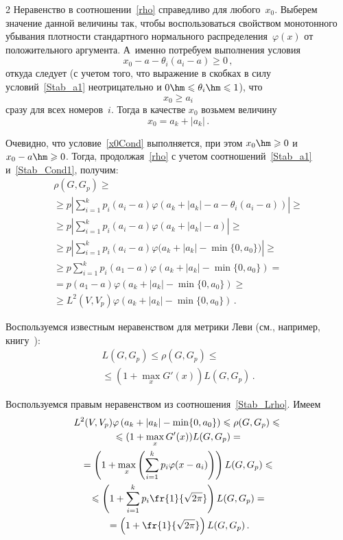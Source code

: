 \begin{multicols}{2}
Неравенство в соотношении~\eqref{rho} справедливо для любого~$x_0$.
Выберем значение данной величины так, чтобы воспользоваться
свойством монотонного убывания плотности стандартного нормального
распределения~$\varphi(x)$ от положительного аргумента. А~именно
потребуем выполнения условия
$$
x_0-a-\theta_i(a_i-a)\geqslant 0\,,
$$
откуда следует (с учетом того, что выражение в скобках
в силу условий~\eqref{Stab_a1} неотрицательно и $0\hm\leqslant\theta_i\hm\leqslant 1$),
что
\begin{equation}
x_0\geqslant a_i 
\label{x0Cond}
\end{equation}
сразу для всех номеров~$i$. Тогда в качестве  $x_0$ возьмем
величину
\begin{equation}
x_0=a_k+|a_k|\,. 
\label{x0}
\end{equation}

Очевидно, что условие~\eqref{x0Cond} выполняется,
при этом $x_0\hm\geqslant 0$ и $x_0-a\hm\geqslant 0$. Тогда, продолжая~\eqref{rho} с
учетом соотношений~\eqref{Stab_a1} и~\eqref{Stab_Cond1}, получим:
\begin{multline*}
\rho(G,G_p)\geqslant{}\\
{}\geqslant p\left|\sum\limits_{i=1}^k
p_i(a_i-a)\varphi\left(a_k+|a_k|-a-\theta_i(a_i-a)\right)\right|\geqslant{}\\
{}\geqslant p\left|\sum\limits_{i=1}^k p_i(a_i-a)\varphi\left(a_k+|a_k|-a\right)\right|
\geqslant{}\\
{}\geqslant p\left|\sum\limits_{i=1}^k
p_i(a_i-a)\varphi\Big(a_k+|a_k|-\min\{0,a_0\}\Big)\right|\geqslant{}\\
{}\geqslant p\sum\limits_{i=1}^k p_i(a_1-a)\varphi\left(a_k+|a_k|-\min\{0,a_0\}\right)
={}\\
{}=p(a_1-a)\varphi\left(a_k+|a_k|-\min\{0,a_0\}\right)\geqslant{}\\
{}\geqslant L^2(V,V_p)\varphi\left(a_k+|a_k|-\min\{0,a_0\}\right)\,.
\end{multline*}

Воспользуемся известным неравенством для мет\-ри\-ки Леви (см.,
например, книгу~\cite{Zolotarev1986}):
\begin{multline}
\label{Stab_Lrho} 
L(G,G_p)\leqslant\rho(G,G_p)\leqslant{}\\
{}\leqslant (1+\max\limits_x
G'(x))L(G,G_p)\,.
\end{multline}

Воспользуемся правым неравенством из соотношения~\eqref{Stab_Lrho}.
Имеем
\begin{multline*}
L^2(V,V_p)\varphi\left(a_k+|a_k|-\min\{0,a_0\}\right)\leqslant\rho(G,G_p)\leqslant{}\\
{}\leqslant (1+
\max\limits_x G'(x))L(G,G_p)={}\\
{}=\left(1+\max\limits_x \left(\sum\limits_{i=1}^k
p_i\varphi(x-a_i) \right)\right)L(G,G_p)\leqslant{}\\
{}\leqslant
\left(1+\sum\limits_{i=1}^k
p_i \fr {1}{\sqrt{2\pi}}\right)L(G,G_p)={}\\
{}=\left(1+\fr{1}{\sqrt{2\pi}}\right)L(G,G_p)\,.
\end{multline*}


\end{multicols}
